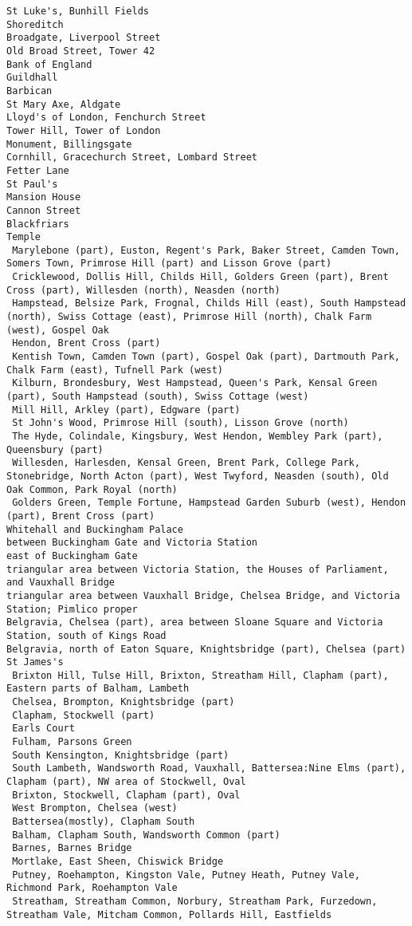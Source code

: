 \documentclass[11pt]{article}
\begin{document}
\begin{Verbatim}[commandchars=\\\{\}]
St Luke's, Bunhill Fields
Shoreditch
Broadgate, Liverpool Street
Old Broad Street, Tower 42
Bank of England
Guildhall
Barbican
St Mary Axe, Aldgate
Lloyd's of London, Fenchurch Street
Tower Hill, Tower of London
Monument, Billingsgate
Cornhill, Gracechurch Street, Lombard Street
Fetter Lane
St Paul's
Mansion House
Cannon Street
Blackfriars
Temple
 Marylebone (part), Euston, Regent's Park, Baker Street, Camden Town,  Somers Town, Primrose Hill (part) and Lisson Grove (part)
 Cricklewood, Dollis Hill, Childs Hill, Golders Green (part), Brent Cross (part), Willesden (north), Neasden (north)
 Hampstead, Belsize Park, Frognal, Childs Hill (east), South Hampstead (north), Swiss Cottage (east), Primrose Hill (north), Chalk Farm (west), Gospel Oak
 Hendon, Brent Cross (part)
 Kentish Town, Camden Town (part), Gospel Oak (part), Dartmouth Park, Chalk Farm (east), Tufnell Park (west)
 Kilburn, Brondesbury, West Hampstead, Queen's Park, Kensal Green (part), South Hampstead (south), Swiss Cottage (west)
 Mill Hill, Arkley (part), Edgware (part)
 St John's Wood, Primrose Hill (south), Lisson Grove (north)
 The Hyde, Colindale, Kingsbury, West Hendon, Wembley Park (part), Queensbury (part)
 Willesden, Harlesden, Kensal Green, Brent Park, College Park, Stonebridge, North Acton (part), West Twyford, Neasden (south), Old Oak Common, Park Royal (north)
 Golders Green, Temple Fortune, Hampstead Garden Suburb (west), Hendon (part), Brent Cross (part)
Whitehall and Buckingham Palace
between Buckingham Gate and Victoria Station
east of Buckingham Gate
triangular area between Victoria Station, the Houses of Parliament, and Vauxhall Bridge
triangular area between Vauxhall Bridge, Chelsea Bridge, and Victoria Station; Pimlico proper
Belgravia, Chelsea (part), area between Sloane Square and Victoria Station, south of Kings Road
Belgravia, north of Eaton Square, Knightsbridge (part), Chelsea (part)
St James's
 Brixton Hill, Tulse Hill, Brixton, Streatham Hill, Clapham (part), Eastern parts of Balham, Lambeth
 Chelsea, Brompton, Knightsbridge (part)
 Clapham, Stockwell (part)
 Earls Court
 Fulham, Parsons Green
 South Kensington, Knightsbridge (part)
 South Lambeth, Wandsworth Road, Vauxhall, Battersea:Nine Elms (part), Clapham (part), NW area of Stockwell, Oval
 Brixton, Stockwell, Clapham (part), Oval
 West Brompton, Chelsea (west)
 Battersea(mostly), Clapham South
 Balham, Clapham South, Wandsworth Common (part)
 Barnes, Barnes Bridge
 Mortlake, East Sheen, Chiswick Bridge
 Putney, Roehampton, Kingston Vale, Putney Heath, Putney Vale, Richmond Park, Roehampton Vale
 Streatham, Streatham Common, Norbury, Streatham Park, Furzedown, Streatham Vale, Mitcham Common, Pollards Hill, Eastfields

\end{Verbatim}
\end{document}
